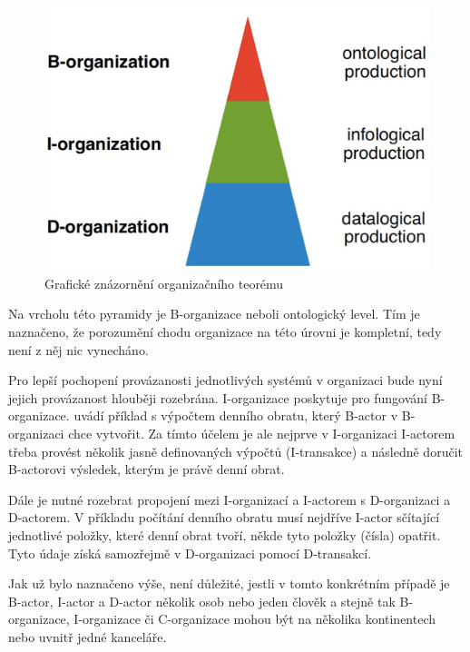 \begin{center}
\begin{figure}[H]
\centerline{\includegraphics[scale=0.3]{obrazky/organization-theorem}}
\caption{Grafické znázornění organizačního teorému \cite{Dietz2006}}
\label{fig:oraganization_theorem}
\end{figure}
\end{center}

Na vrcholu této pyramidy je B-organizace neboli ontologický level. Tím je naznačeno, že porozumění chodu organizace na této úrovni je kompletní, tedy není z něj nic vynecháno.

Pro lepší pochopení provázanosti jednotlivých systémů v organizaci bude nyní jejich provázanost hlouběji rozebrána. I-organizace poskytuje  pro fungování B-organizace. \cite{Dietz2006} uvádí příklad s výpočtem denního obratu, který B-actor v B-organizaci chce vytvořit. Za tímto účelem je ale nejprve v I-organizaci I-actorem třeba provést několik jasně definovaných výpočtů (I-transakce) a následně doručit B-actorovi výsledek, kterým je právě denní obrat.

Dále je nutné rozebrat propojení mezi I-organizací a I-actorem s D-organizaci a D-actorem. V příkladu počítání denního obratu musí nejdříve I-actor sčítající jednotlivé položky, které denní obrat tvoří, někde tyto položky (čísla) opatřit. Tyto údaje získá samozřejmě v D-organizaci pomocí D-transakcí.

Jak už bylo naznačeno výše, není důležité, jestli v tomto konkrétním případě je B-actor, I-actor a D-actor několik osob nebo jeden člověk a stejně tak B-organizace, I-organizace či C-organizace mohou být na několika kontinentech nebo uvnitř jedné kanceláře.

